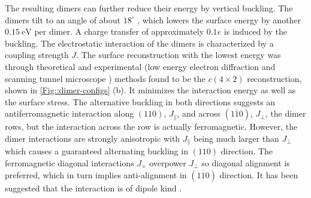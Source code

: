 	The resulting dimers can further reduce their energy by vertical buckling. The dimers tilt to an angle of about $18^\circ$ \cite{ramstad1995theoretical, pillay2004revisit}, which lowers the surface energy by another $0.15~\text{eV}$ \cite{inoue1994order} per dimer. A charge transfer of approximately $0.1 e$  \cite{brand2023critical, landemark1992core} is induced by the buckling. The electrostatic interaction of the dimers is characterized by a coupling strength $J$. The surface reconstruction with the lowest energy was through theoretical \cite{ramstad1995theoretical, pillay2004revisit, inoue1994order, brand2023critical} and experimental (low energy electron diffraction \cite{matsumoto2003low, kubota1994streak, brand2023critical} and scanning tunnel microscope \cite{wolkow1992direct, tochihara1994low})  methods found to be the $c(4\times 2)$ reconstruction, shown in \autoref{Fig::dimer-configs} (b). It minimizes the interaction energy as well as the surface stress. The alternative buckling in both directions suggests an antiferromagnetic interaction along $(110)$, $J_\parallel$, and across $(1\overline{1}0)$, $J_\perp$, the dimer rows, but the interaction across the row is actually ferromagnetic. However, the dimer interactions are strongly anisotropic with $J_\parallel$ being much larger than $J_\perp$ which causes a guaranteed alternating buckling in $(110)$ direction. The ferromagnetic diagonal interactions $J_\times$ overpower $J_\perp$ so diagonal alignment is preferred, which in turn implies anti-alignment in $(1\overline{1}0)$ direction. It has been suggested that the interaction is of dipole kind \cite{pillay2004revisit}.
